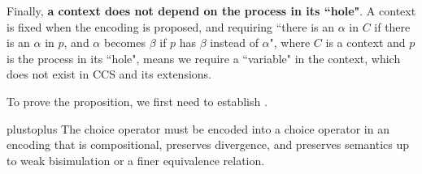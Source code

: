 \documentclass[adraft,hidelinks]{eptcs}
\begin{document}
Finally, \textbf{a context does not depend on the process in its ``hole"}.
A context is fixed when the encoding is proposed, and requiring ``there is an $\alpha$ in $C$ if there is an $\alpha$ in $p$, and $\alpha$ becomes $\beta$ if $p$ has $\beta$ instead of $\alpha$", where $C$ is a context and $p$ is the process in its ``hole", means we require a ``variable" in the context, which does not exist in CCS and its extensions.

To prove the proposition, we first need to establish .

\begin{lemma}{plustoplus}
  The choice operator must be encoded into a choice operator in an encoding that is compositional, preserves divergence,  and preserves semantics up to weak bisimulation or a finer equivalence relation.
\end{lemma}
\end{document}
